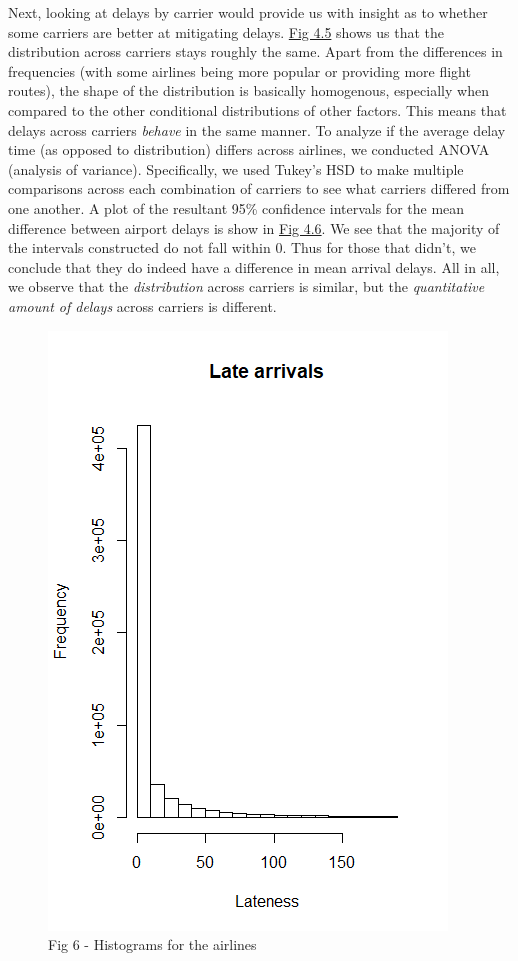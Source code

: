 \documentclass[12pt, a4paper]{book}
\newcommand\tab[1][1cm]{\hspace*{#1}}
\begin{document}
			\tab Next, looking at delays by carrier would provide us with insight as to whether some carriers are better at mitigating delays. \underline{Fig 4.5} shows us that the distribution across carriers stays roughly the same. Apart from the differences in frequencies (with some airlines being more popular or providing more flight routes), the shape of the distribution is basically homogenous, especially when compared to the other conditional distributions of other factors. This means that delays across carriers \textit{behave} in the same manner. To analyze if the average delay time (as opposed to distribution) differs across airlines, we conducted ANOVA (analysis of variance). Specifically, we used Tukey’s HSD to make multiple comparisons across each combination of carriers to see what carriers differed from one another. A plot of the resultant 95\% confidence intervals for the mean difference between airport delays is show in \underline{Fig 4.6}. We see that the majority of the intervals constructed do not fall within 0. Thus for those that didn’t, we conclude that they do indeed have a difference in mean arrival delays. All in all, we observe that the \textit{distribution} across carriers is similar, but the \textit{quantitative amount of delays} across carriers is different. \\
			\begin{figure}[h]
	 		\includegraphics[width = 1 \textwidth]{../figures/LateArrivalsHistogram}
	 		\caption{Fig 6 - Histograms for the airlines}
	 		\end{figure}
\end{document}
